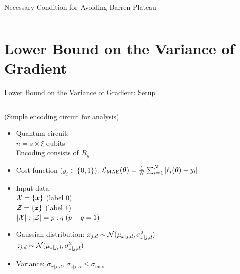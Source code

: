 \documentclass[dvipdfmx,10pt,aspectratio=169]{beamer}
\begin{document}
\begin{frame}{Necessary Condition for Avoiding Barren Plateau}
\begin{columns}
\begin{column}{0.35\textwidth}
        \end{column}
    \end{columns}
\end{frame}





\section{Lower Bound on the Variance of Gradient}
\newcommand{\bgate}[1]{\gate[wires=1,style={fill=cyan!50}][1cm][0.7cm]{\Large #1}}
\newcommand{\rgate}[1]{\gate[wires=4,style={fill=red!50}]{\Large #1}}
\begin{frame}{Lower Bound on the Variance of Gradient: Setup}
    \vspace{-15pt}
    \begin{columns}
        \begin{column}{0.4\textwidth}
            \begin{footnotesize}
                (Simple encoding circuit for analysis)
            \end{footnotesize}
            \begin{itemize}
                \setlength{\itemsep}{5pt}
                \item Quantum circuit: \\$n = s \times \xi$ qubits\\Encoding consists of $R_y$
                \item Cost function ($y_i\in \{0,1\}$): $\calL_{\mathrm{MAE}}(\bth) = \frac1N\sum_{i=1}^N |\ell_{i}(\bth) - y_i|$
                \item Input data: \\$\calX = \{\bs{x}\}$ (label $0$)\\$\calZ = \{\bs{z}\}$ (label $1$)\\$|\calX|:|\calZ| = p:q\;(p+q=1)$
                \item Gaussian distribution: $x_{j,d} \sim \calN(\mu_{x|j,d}, \sigma_{x|j,d}^2)$\\$z_{j,d} \sim \calN(\mu_{z|j,d}, \sigma_{z|j,d}^2)$
                \item Variance: $\sigma_{x|j,d},\, \sigma_{z|j,d} \leq \sigma_{\max}$
            \end{itemize}
        \end{column}
        \begin{column}{0.5\textwidth}
        \begin{figure}[H]
            \centering
            \begin{tikzpicture}

\end{tikzpicture}
\end{figure}
\end{column}
\end{columns}
\end{frame}
\end{document}
